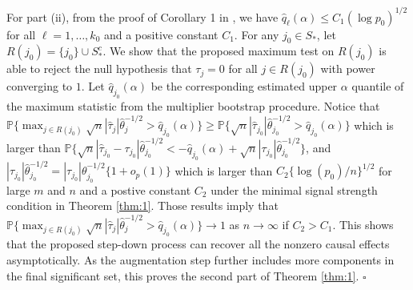 \documentclass[12pt]{article}
\theoremstyle{definition}
\begin{document}
For part (ii), from the proof of Corollary 1 in \cite{ChangQiuYao_2016}, we have
$\hat{q}_{\ell}(\alpha)\leq C_1 (\log p_0)^{1/2}$ for all $\ell = 1, \ldots, k_0$ and a positive constant $C_1$.
For any $j_0 \in S_{\ast}$, let $R(j_0) = \{j_0\} \cup S_{\ast}^{c}$.
We show that the proposed maximum test on $R(j_0)$ is able to reject the null hypothesis that $\tau_{j} = 0$ for all $j \in R(j_0)$ with power converging to $1$. 
Let $\hat{q}_{j_0}(\alpha)$ be the corresponding estimated upper $\alpha$ quantile of the maximum statistic from the multiplier bootstrap procedure.
Notice that $\mathbb{P}\big\{ \max_{j \in R(j_0)} \sqrt{n} |\hat{\tau}_{j}| \hat{\theta}_j^{-1/2} > \hat{q}_{j_0}(\alpha) \big\}
\geq \mathbb{P}\big\{ \sqrt{n} |\hat{\tau}_{j_0}| \hat{\theta}_{j_0}^{-1/2} > \hat{q}_{j_0}(\alpha) \big\}$ which is larger than $\mathbb{P}\big\{ \sqrt{n} |\hat{\tau}_{j_0} - \tau_{j_0}| \hat{\theta}_{j_0}^{-1/2} < - \hat{q}_{j_0}(\alpha) + \sqrt{n}|\tau_{j_0}| \hat{\theta}_{j_0}^{-1/2} \big\}$, and 
$|\tau_{j_0}| \hat{\theta}_{j_0}^{-1/2} = |\tau_{j_0}| \theta_{j_0}^{-1/2} \{1 + o_p(1)\}$ which is larger than $C_{2} \{\log (p_0) / n\}^{1/2}$ for large $m$ and $n$ and a postive constant $C_2$ under the minimal signal strength condition in Theorem \ref{thm:1}.
Those results imply that $\mathbb{P}\big\{ \max_{j \in R(j_0)} \sqrt{n} |\hat{\tau}_{j}| \hat{\theta}_j^{-1/2} > \hat{q}_{j_0}(\alpha) \big\} \to 1$ as $n \to \infty$ if $C_2 > C_1$. 
This shows that the proposed step-down process can recover all the nonzero causal effects asymptotically. As the augmentation step further includes more components in the final significant set, this proves the second part of Theorem \ref{thm:1}. $\square$
\end{document}
